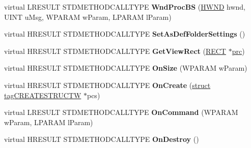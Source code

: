 \begin{DoxyCompactItemize}
\item 
\mbox{\label{class_c_shell_browser_aeaaa783dfe9341397096ec94c21001ca}} 
virtual L\+R\+E\+S\+U\+LT S\+T\+D\+M\+E\+T\+H\+O\+D\+C\+A\+L\+L\+T\+Y\+PE {\bfseries Wnd\+Proc\+BS} (\hyperlink{interfacevoid}{H\+W\+ND} hwnd, U\+I\+NT u\+Msg, W\+P\+A\+R\+AM w\+Param, L\+P\+A\+R\+AM l\+Param)
\item 
\mbox{\label{class_c_shell_browser_aa4f64401bf1d08211f2b2966dfa550f7}} 
virtual H\+R\+E\+S\+U\+LT S\+T\+D\+M\+E\+T\+H\+O\+D\+C\+A\+L\+L\+T\+Y\+PE {\bfseries Set\+As\+Def\+Folder\+Settings} ()
\item 
\mbox{\label{class_c_shell_browser_accbdb64e0dd7bd1202ae7db0bf239d43}} 
virtual H\+R\+E\+S\+U\+LT S\+T\+D\+M\+E\+T\+H\+O\+D\+C\+A\+L\+L\+T\+Y\+PE {\bfseries Get\+View\+Rect} (\hyperlink{structtag_r_e_c_t}{R\+E\+CT} $\ast$\hyperlink{structtag_r_e_c_t}{prc})
\item 
\mbox{\label{class_c_shell_browser_a6d7af9f875c784ee62119be7c8c2a259}} 
virtual H\+R\+E\+S\+U\+LT S\+T\+D\+M\+E\+T\+H\+O\+D\+C\+A\+L\+L\+T\+Y\+PE {\bfseries On\+Size} (W\+P\+A\+R\+AM w\+Param)
\item 
\mbox{\label{class_c_shell_browser_a261e18391915d58a3120bf8dd46ac0f2}} 
virtual H\+R\+E\+S\+U\+LT S\+T\+D\+M\+E\+T\+H\+O\+D\+C\+A\+L\+L\+T\+Y\+PE {\bfseries On\+Create} (\hyperlink{interfacestruct}{struct} \hyperlink{structtag_c_r_e_a_t_e_s_t_r_u_c_t_w}{tag\+C\+R\+E\+A\+T\+E\+S\+T\+R\+U\+C\+TW} $\ast$pcs)
\item 
\mbox{\label{class_c_shell_browser_aeab30cd46ac9b14a0be71e6c1029038c}} 
virtual L\+R\+E\+S\+U\+LT S\+T\+D\+M\+E\+T\+H\+O\+D\+C\+A\+L\+L\+T\+Y\+PE {\bfseries On\+Command} (W\+P\+A\+R\+AM w\+Param, L\+P\+A\+R\+AM l\+Param)
\item 
\mbox{\label{class_c_shell_browser_a48fe5eb5a94ca63c2118e8f322d3781b}} 
virtual H\+R\+E\+S\+U\+LT S\+T\+D\+M\+E\+T\+H\+O\+D\+C\+A\+L\+L\+T\+Y\+PE {\bfseries On\+Destroy} ()
\item 
\mbox{\label{class_c_shell_browser_a9d92d54056fa3c267be550014eb8d99d}} 

\end{DoxyCompactItemize}
